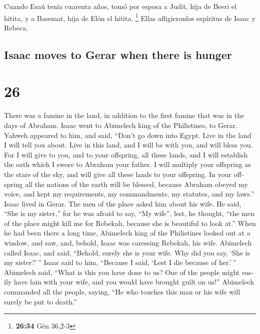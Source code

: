 \begin{paracol}{2}
 Cuando Esaú tenía cuarenta años, tomó por esposa a
Judit, hija de Beeri el hitita, y a Basemat, hija de Elón el hitita.
\footnote{\textbf{26:34} Gén 36,2-3}  Ellas afligieronlos
espíritus de Isaac y Rebeca.

\switchcolumn
\begin{otherlanguage}{english}

\hypertarget{isaac-moves-to-gerar-when-there-is-hunger}{%
\subsection{Isaac moves to Gerar when there is
hunger}\label{isaac-moves-to-gerar-when-there-is-hunger}}

\hypertarget{section-51}{%
\section{26}\label{section-51}}

 There was a famine in the land, in addition to the first
famine that was in the days of Abraham. Isaac went to Abimelech king of
the Philistines, to Gerar.  Yahweh appeared to him, and
said, ``Don't go down into Egypt. Live in the land I will tell you
about.  Live in this land, and I will be with you, and
will bless you. For I will give to you, and to your offspring, all these
lands, and I will establish the oath which I swore to Abraham your
father.  I will multiply your offspring as the stars of
the sky, and will give all these lands to your offspring. In your
offspring all the nations of the earth will be blessed, 
because Abraham obeyed my voice, and kept my requirements, my
commandments, my statutes, and my laws.''  Isaac lived in
Gerar.  The men of the place asked him about his wife. He
said, ``She is my sister,'' for he was afraid to say, ``My wife'', lest,
he thought, ``the men of the place might kill me for Rebekah, because
she is beautiful to look at.''  When he had been there a
long time, Abimelech king of the Philistines looked out at a window, and
saw, and, behold, Isaac was caressing Rebekah, his wife. 
Abimelech called Isaac, and said, ``Behold, surely she is your wife. Why
did you say, `She is my sister?'\,'' Isaac said to him, ``Because I
said, `Lest I die because of her.'\,''  Abimelech said,
``What is this you have done to us? One of the people might easily have
lain with your wife, and you would have brought guilt on us!''
 Abimelech commanded all the people, saying, ``He who
touches this man or his wife will surely be put to death.''


\end{otherlanguage}
\end{paracol}

